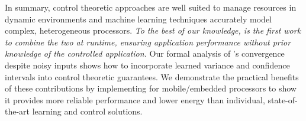 In summary, control theoretic approaches are well suited to manage
resources in dynamic environments and machine learning techniques
accurately model complex, heterogeneous processors.  \emph{To the best
  of our knowledge, \SYSTEM{} is the first work to combine the two at
  runtime, ensuring application performance without prior knowledge of
  the controlled application.}  Our formal analysis of \SYSTEM{}'s
convergence despite noisy inputs shows how to incorporate learned
variance and confidence intervals into control theoretic guarantees.
We demonstrate the practical benefits of these contributions by
implementing \SYSTEM{} for mobile/embedded processors to show it
provides more reliable performance and lower energy than individual,
state-of-the-art learning and control solutions.


